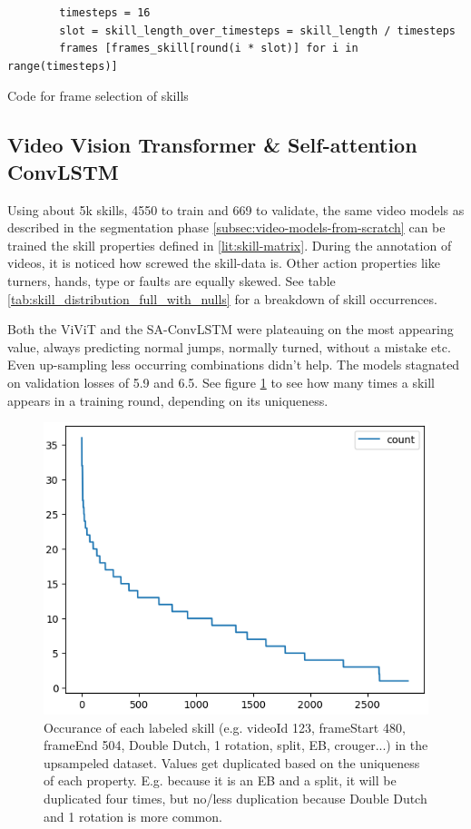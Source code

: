 \begin{listing}
    \begin{verbatim}
        timesteps = 16
        slot = skill_length_over_timesteps = skill_length / timesteps
        frames [frames_skill[round(i * slot)] for i in range(timesteps)]
    \end{verbatim}
    \caption[Code for frame selection skills]{Code for frame selection of skills}
    \label{code:skill-frame-selection}
\end{listing}



\subsection{Video Vision Transformer \& Self-attention ConvLSTM}

Using about 5k skills, 4550 to train and 669 to validate, the same video models as described in the segmentation phase \ref{subsec:video-models-from-scratch} can be trained the skill properties defined in \ref{lit:skill-matrix}.
During the annotation of videos, it is noticed how screwed the skill-data is. Other action properties like turners, hands, type or faults are equally skewed. See table \ref{tab:skill_distribution_full_with_nulls} for a breakdown of skill occurrences.

Both the ViViT and the SA-ConvLSTM were plateauing on the most appearing value, always predicting normal jumps, normally turned, without a mistake etc.
Even up-sampling less occurring combinations didn't help. The models stagnated on validation losses of 5.9 and 6.5. See figure \ref{fig:skill-upsampling-distribution} to see how many times a skill appears in a training round, depending on its uniqueness.

\begin{figure}
    \centering
    \includegraphics[width=0.7\linewidth]{img/skill-upsampling-distribution}
    \caption[upsampling distribution of skills]{Occurance of each labeled skill (e.g. videoId 123, frameStart 480, frameEnd 504, Double Dutch, 1 rotation, split, EB, crouger...) in the upsampeled dataset. Values get duplicated based on the uniqueness of each property. E.g. because it is an EB and a split, it will be duplicated four times, but no/less duplication because Double Dutch and 1 rotation is more common.}
    \label{fig:skill-upsampling-distribution}
\end{figure}

